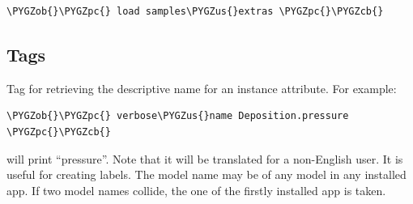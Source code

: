 \documentclass[a4paper,11pt,english]{sphinxmanual}
\def\PYGZus{\char`\_}
\def\PYGZob{\char`\{}
\def\PYGZcb{\char`\}}
\def\PYGZpc{\char`\%}
\begin{document}
\begin{Verbatim}[commandchars=\\\{\},formatcom=\scriptsize]
\PYGZob{}\PYGZpc{} load samples\PYGZus{}extras \PYGZpc{}\PYGZcb{}
\end{Verbatim}


\subsection{Tags}
\label{programming/template_tags_and_filters:id1}

\begin{fulllineitems}
\label{programming/template_tags_and_filters:samples.templatetags.samples_extras.verbose_name}
Tag for retrieving the descriptive name for an instance attribute.  For
example:

\begin{Verbatim}[commandchars=\\\{\},formatcom=\scriptsize]
\PYGZob{}\PYGZpc{} verbose\PYGZus{}name Deposition.pressure \PYGZpc{}\PYGZcb{}
\end{Verbatim}

will print “pressure”.  Note that it will be translated for a non-English
user.  It is useful for creating labels.  The model name may be of any
model in any installed app.  If two model names collide, the one of the
firstly installed app is taken.

\end{fulllineitems}

\end{document}
